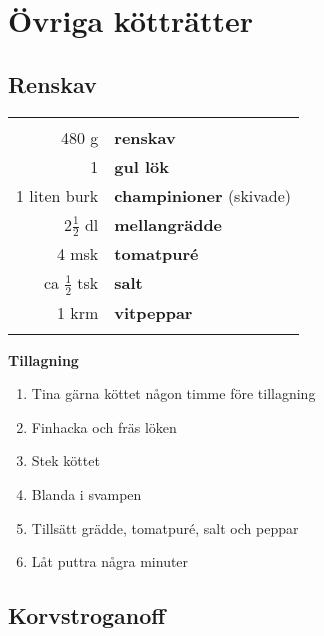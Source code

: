 
\section{Övriga kötträtter}

\clearpage

\subsection{Renskav}

\begin{table}[H]
	\begin{tabular}{rl}
	\hline
	&\\
		480 g & \textbf{renskav}\\
		1 & \textbf{gul lök}\\
		1 liten burk & \textbf{champinioner} (skivade)\\
		2$\frac{1}{2}$ dl & \textbf{mellangrädde}\\
		4 msk & \textbf{tomatpuré}\\
		ca $\frac{1}{2}$ tsk & \textbf{salt}\\
		1 krm & \textbf{vitpeppar}\\
	&\\
	\hline
	\end{tabular}
\end{table}


\begin{multicols*}{2}

\noindent \textbf{Tillagning}
\begin{enumerate}
	\itemsep0cm
	\item Tina gärna köttet någon timme före tillagning
	\item Finhacka och fräs löken
	\item Stek köttet
	\item Blanda i svampen
	\item Tillsätt grädde, tomatpuré, salt och peppar
	\item Låt puttra några minuter
\end{enumerate}

\end{multicols*}

\clearpage

\subsection{Korvstroganoff}

